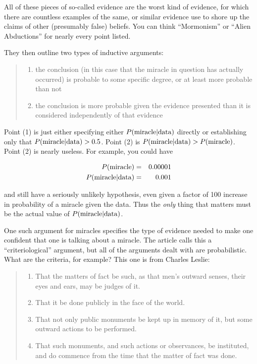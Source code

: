 All of these pieces of so-called evidence are the worst kind of
evidence, for which there are countless examples of the same, or similar
evidence use to shore up the claims of other (presumably false) beliefs.
You can think ``Mormonism'' or ``Alien Abductions'' for nearly every
point listed.

They then outline two types of inductive arguments:

\begin{quote}
\begin{enumerate}
\def\labelenumi{\arabic{enumi}.}
\itemsep1pt\parskip0pt
\item
  the conclusion (in this case that the miracle in question has actually
  occurred) is probable to some specific degree, or at least more
  probable than not
\item
  the conclusion is more probable given the evidence presented than it
  is considered independently of that evidence
\end{enumerate}
\end{quote}

Point (1) is just either specifying either
\(P({\rm miracle}|{\rm data})\) directly or establishing only that
\(P({\rm miracle}|{\rm data})>0.5\). Point (2) is
\(P({\rm miracle}|{\rm data})>P({\rm miracle})\). Point (2) is nearly
useless. For example, you could have

\begin{eqnarray*}
P({\rm miracle})&=&0.00001 \\
P({\rm miracle}|{\rm data})&=&0.001
\end{eqnarray*}

and still have a seriously unlikely hypothesis, even given a factor of
100 increase in probability of a miracle given the data. Thus the
\emph{only} thing that matters must be the actual value of
\(P({\rm miracle}|{\rm data})\).

One such argument for miracles specifies the type of evidence needed to
make one confident that one is talking about a miracle. The article
calls this a ``criteriological'' argument, but all of the arguments
dealt with are probabilistic. What are the criteria, for example? This
one is from Charles Leslie:

\begin{quote}
\begin{enumerate}
\def\labelenumi{\arabic{enumi}.}
\itemsep1pt\parskip0pt
\item
  That the matters of fact be such, as that men's outward senses, their
  eyes and ears, may be judges of it.
\item
  That it be done publicly in the face of the world.
\item
  That not only public monuments be kept up in memory of it, but some
  outward actions to be performed.
\item
  That such monuments, and such actions or observances, be instituted,
  and do commence from the time that the matter of fact was done.
\end{enumerate}
\end{quote}

